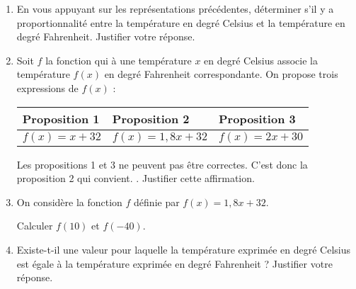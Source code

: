 \begin{enumerate}
\item En vous appuyant sur les représentations précédentes, déterminer s'il y a
proportionnalité entre la température en degré Celsius et la température en degré
Fahrenheit. Justifier votre réponse.
\item  Soit $f$ la fonction qui à une température $x$ en degré Celsius associe la température
$f(x)$ en degré Fahrenheit correspondante. On propose trois expressions de $f(x)$ :

\begin{center}
\begin{tabularx}{0.8\linewidth}{|*{3}{>{\centering \arraybackslash}X|}}\hline
Proposition 1 &Proposition 2& Proposition 3\\ \hline
$f(x) = x+32$& $f(x) = 1,8x + 32$& $f(x) = 2x + 30$\\ \hline
\end{tabularx}
\end{center}

\og Les propositions 1 et 3 ne peuvent pas être correctes. C'est donc la proposition 2 qui
convient. \fg. Justifier cette affirmation.
\item  On considère la fonction $f$ définie par $f(x) = 1,8x + 32$.

Calculer $f(10)$ et $f(-40)$.
\item  Existe-t-il une valeur pour laquelle la température exprimée en degré Celsius est égale
à la température exprimée en degré Fahrenheit ? Justifier votre réponse.
\end{enumerate}

\vspace{0,5cm}

